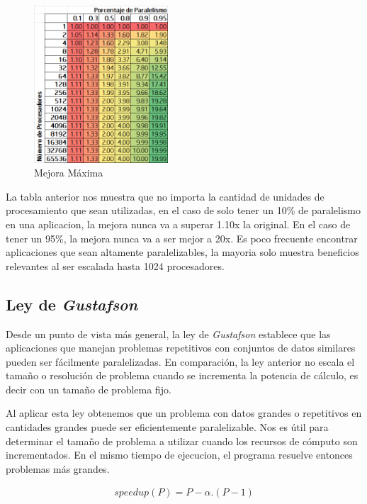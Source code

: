 \documentclass[a4paper]{report}
\begin{document}
\begin{figure}[H]
\begin{center}
\includegraphics[width=5cm]{amdahl.png}
\caption{Mejora M\'axima}
\end{center}
\end{figure}

La tabla anterior nos muestra que no importa la cantidad de unidades de procesamiento que sean utilizadas, en el caso de solo tener un 10\% de paralelismo
en una aplicacion, la mejora nunca va a superar 1.10x la original. En el caso de tener un 95\%, la mejora nunca va a ser mejor a 20x. Es poco frecuente encontrar aplicaciones que sean altamente paralelizables, la mayoria solo muestra beneficios relevantes al ser escalada hasta 1024 procesadores.

\subsection{Ley de {\it Gustafson}}

Desde un punto de vista m\'as general, la ley de {\it Gustafson}
\cite{gustafson} establece que las aplicaciones que manejan problemas
repetitivos con conjuntos de datos similares pueden ser f\'acilmente
paralelizadas. En comparaci\'on, la ley anterior no escala el tama\~no o
resoluci\'on de problema cuando se incrementa la potencia de c\'alculo, es
decir con un tama\~no de problema fijo. 

\bigskip

Al aplicar esta ley obtenemos que un problema con datos grandes o repetitivos en cantidades grandes puede ser
eficientemente paralelizable. Nos es \'util para determinar el tama\~no de problema a utilizar cuando los recursos de c\'omputo son incrementados.
En el mismo tiempo de ejecucion, el programa resuelve entonces problemas m\'as grandes.

\begin{eqnarray}
speedup(P) = P - \alpha . ( P - 1)
\end{eqnarray}
\end{document}
